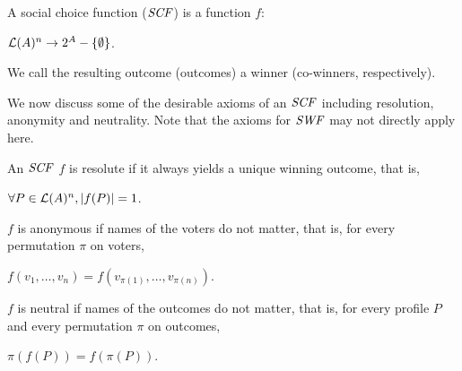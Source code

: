 %
%



\begin{definition}
	A social choice function ($\it{SCF}$) is a function $f$:
	\begin{center}
		$\mathcal{L}(A)^n \rightarrow 2^A-\{\emptyset\}$.
	\end{center}
	We call the resulting outcome (outcomes)
	a winner (co-winners, respectively).
\end{definition}

We now discuss some of the desirable axioms of an $\it{SCF}$ including
resolution, anonymity and neutrality.
Note that the axioms for $\it{SWF}$ may not directly apply here.

\begin{definition}
	An $\it{SCF}$ $f$ is resolute if it always yields a unique winning outcome, that is,
	\begin{center}
		$\forall P \in \mathcal{L}(A)^n, |f(P)|=1$.
	\end{center}
	$f$ is anonymous if names of the voters do not matter, that is,
	for every permutation $\pi$ on voters,
	\begin{center}
		$f({v_1,\ldots,v_n}) = f(v_{\pi(1)},\ldots,v_{\pi(n)})$.
	\end{center}
	$f$ is neutral if names of the outcomes do not matter, that is,
	for every profile $P$ and every permutation $\pi$ on outcomes,
	\begin{center}
		$\pi(f(P)) = f(\pi(P))$.
	\end{center}
\end{definition}

